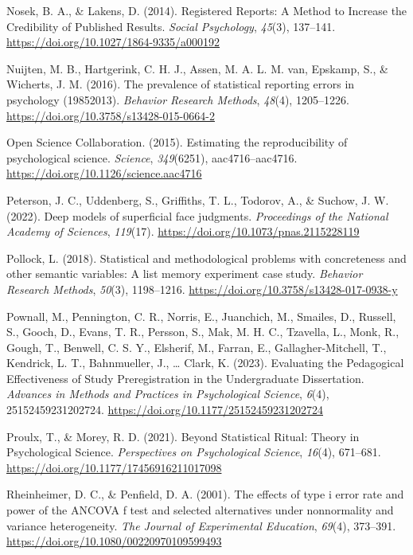 \documentclass[
  man]{apa7}
\newlength{\cslhangindent}
\newenvironment{CSLReferences}[2] %
 {\begin{list}{}{%
  \setlength{\itemindent}{0pt}
  \setlength{\leftmargin}{0pt}
  \setlength{\parsep}{0pt}
  \ifodd #1
   \setlength{\leftmargin}{\cslhangindent}
   \setlength{\itemindent}{-1\cslhangindent}
  \fi
  \setlength{\itemsep}{#2\baselineskip}}}
 {\end{list}}
\begin{document}
\begin{CSLReferences}{1}{0}
Nosek, B. A., \& Lakens, D. (2014). Registered Reports: A Method to Increase the Credibility of Published Results. \emph{Social Psychology}, \emph{45}(3), 137--141. \url{https://doi.org/10.1027/1864-9335/a000192}

Nuijten, M. B., Hartgerink, C. H. J., Assen, M. A. L. M. van, Epskamp, S., \& Wicherts, J. M. (2016). The prevalence of statistical reporting errors in psychology (1985{\textendash}2013). \emph{Behavior Research Methods}, \emph{48}(4), 1205--1226. \url{https://doi.org/10.3758/s13428-015-0664-2}

Open Science Collaboration. (2015). Estimating the reproducibility of psychological science. \emph{Science}, \emph{349}(6251), aac4716--aac4716. \url{https://doi.org/10.1126/science.aac4716}

Peterson, J. C., Uddenberg, S., Griffiths, T. L., Todorov, A., \& Suchow, J. W. (2022). Deep models of superficial face judgments. \emph{Proceedings of the National Academy of Sciences}, \emph{119}(17). \url{https://doi.org/10.1073/pnas.2115228119}

Pollock, L. (2018). Statistical and methodological problems with concreteness and other semantic variables: A list memory experiment case study. \emph{Behavior Research Methods}, \emph{50}(3), 1198--1216. \url{https://doi.org/10.3758/s13428-017-0938-y}

Pownall, M., Pennington, C. R., Norris, E., Juanchich, M., Smailes, D., Russell, S., Gooch, D., Evans, T. R., Persson, S., Mak, M. H. C., Tzavella, L., Monk, R., Gough, T., Benwell, C. S. Y., Elsherif, M., Farran, E., Gallagher-Mitchell, T., Kendrick, L. T., Bahnmueller, J., \ldots{} Clark, K. (2023). Evaluating the Pedagogical Effectiveness of Study Preregistration in the Undergraduate Dissertation. \emph{Advances in Methods and Practices in Psychological Science}, \emph{6}(4), 25152459231202724. \url{https://doi.org/10.1177/25152459231202724}

Proulx, T., \& Morey, R. D. (2021). Beyond Statistical Ritual: Theory in Psychological Science. \emph{Perspectives on Psychological Science}, \emph{16}(4), 671--681. \url{https://doi.org/10.1177/17456916211017098}

Rheinheimer, D. C., \& Penfield, D. A. (2001). The effects of type i error rate and power of the ANCOVA f test and selected alternatives under nonnormality and variance heterogeneity. \emph{The Journal of Experimental Education}, \emph{69}(4), 373--391. \url{https://doi.org/10.1080/00220970109599493}


\end{CSLReferences}
\end{document}
